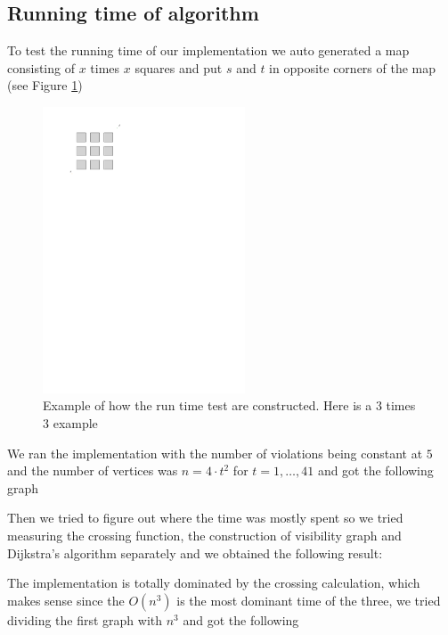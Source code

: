 \subsection{Running time of algorithm}
To test the running time of our implementation we auto generated a map consisting of
$x$ times $x$ squares and put $s$ and $t$ in opposite corners of the map (see Figure
\ref{fig:test})

\begin{figure}[H]
    \centering
	\includegraphics[width=6cm]{figures/testexample.pdf}
	\caption{Example of how the run time test are constructed. Here is a $3$
	times $3$ example}
	\label{fig:test}
\end{figure}
\label{testfilegeneration}
We ran the implementation with the number of violations being constant at $5$ and the
number of vertices was $n= 4 \cdot t^2$ for $t=1,\dots,41$ and got the following graph

\begin{center}

\end{center}

Then we tried to figure out where the time was mostly spent so we tried measuring the
crossing function, the construction of visibility graph and Dijkstra's
algorithm separately and we obtained the following result:

\begin{center}

\end{center}

The implementation is totally dominated by the crossing calculation, which makes
sense since the $O(n^3)$ is the most dominant time of the three, we tried dividing the first graph
with $n^3$ and got the following

